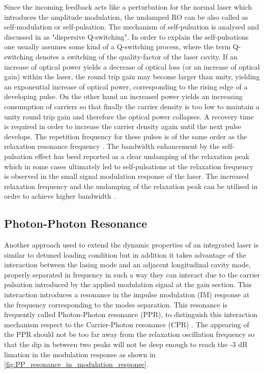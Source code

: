Since the incoming feedback acts like a perturbation for the normal laser which introduces the amplitude modulation, the undamped RO can be also called as self-modulation or self-pulsation. The mechanism of self-pulsation is analysed and discussed in \cite{bandelow1993theory} as "dispersive Q-switching". In order to explain the self-pulsations one usually assumes some kind of a Q-switching process, where the term Q-switching denotes a switching of the quality-factor of the laser cavity. If an increase of optical power yields a decrease of optical loss (or an increase of optical gain) within the laser, the round trip gain may become larger than unity, yielding an exponential increase of optical power, corresponding to the rising edge of a developing pulse. On the other hand an increased power yields an increasing consumption of carriers so that finally the carrier density is too low to maintain a unity round trip gain and therefore the optical power collapses. A recovery time is required in order to increase the carrier density again until the next pulse develops. The repetition frequency for these pulses is of the same order as the relaxation resonance frequency \cite{petermann2012laser}. The bandwidth enhancement by the self-pulsation effect has beed reported as a clear undamping of the relaxation peak which in some cases ultimately led to self-pulsations at the relaxation frequency is observed in the small signal modulation response of the laser. The increased relaxation frequency and the undamping of the relaxation peak can be utilised in ordre to achieve higher bandwidth \cite{schatz1996enhanced}.

\subsection{Photon-Photon Resonance}\label{subsec:pp_resonance}
Another approach used to extend the dynamic properties of an integrated laser is similar to detuned loading condition but in addition it takes advantage of the interaction between the lasing mode and an adjacent longitudinal cavity mode, properly separated in frequency in such a way they can interact due to the carrier pulsation introduced by the applied modulation signal at the gain section. This interaction introduces a resonance in the impulse modulation (IM) response at the frequency corresponding to the modes separation. This resonance is frequently called Photon-Photon resonance (PPR), to distinguish this interaction mechanism respect to the Carrier-Photon resonance (CPR) \cite{montrosset2014laser}. The appearing of the PPR should not be too far away from the relaxation oscillation frequency so that the dip in between two peaks will not be deep enough to reach the -3 dB limation in the modulation response as shown in \autoref{fig:PP_resonance_in_modulation_response}.


